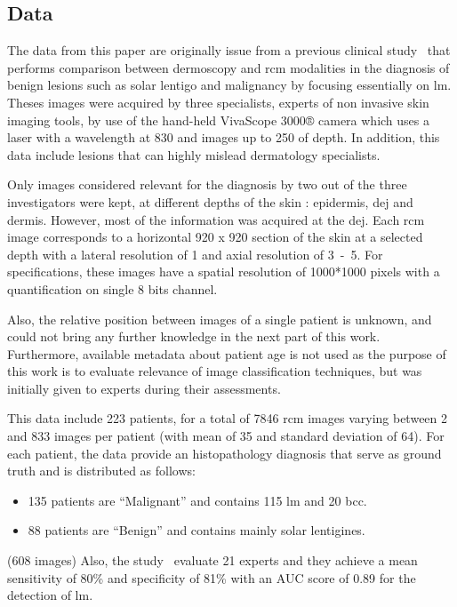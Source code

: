 \documentclass[journal,article,submit,moreauthors,pdftex, applsci]{Definitions/mdpi}
\begin{document}
\subsection{Data}
\label{sec:data}
The data from this paper are originally issue from a previous clinical study~\cite{Cinotti2018} that performs comparison between dermoscopy and \ac{rcm} modalities in the diagnosis of benign lesions such as solar lentigo and malignancy by focusing essentially on \ac{lm}. Theses images were acquired by three specialists, experts of non invasive skin imaging tools, by use of the hand-held VivaScope 3000® camera which uses a laser with a wavelength at \unit{830}{\nano\meter} and images up to \unit{250}{\micro\meter} of depth. In addition, this data include lesions that can highly mislead dermatology specialists.\par
Only images considered relevant for the diagnosis by two out of the three investigators were kept, at different depths of the skin : epidermis, \ac{dej} and dermis. However, most of the information was acquired at the \ac{dej}. Each \ac{rcm} image corresponds to a horizontal \unit{920}{\micro\meter} x \unit{920}{\micro\meter} section of the skin at a selected depth with a lateral resolution of \unit{1}{\micro\meter} and axial resolution of \unit{3-5}{\micro\meter}. For specifications, these images have a spatial resolution of 1000*1000 pixels with a quantification on single 8 bits channel.\par
Also, the relative position between images of a single patient is unknown, and could not bring any further knowledge in the next part of this work. Furthermore, available metadata about patient age is not used as the purpose of this work is to evaluate relevance of image classification techniques, but was initially given to experts during their assessments.\par
This data include 223 patients, for a total of 7846 \ac{rcm} images varying between 2 and 833 images per patient (with mean of 35 and standard deviation of 64). For each patient, the data provide an histopathology diagnosis that serve as ground truth and is distributed as follows:
\begin{itemize}  
\item 135 patients are “Malignant” and contains 115 \ac{lm} and 20 \ac{bcc}.
\item 88 patients are “Benign” and contains mainly solar lentigines.
\end{itemize} (608 images) 
Also, the study~\cite{Cinotti2018} evaluate 21 experts and they achieve a mean sensitivity of 80\% and specificity of 81\% with an AUC score of 0.89 for the detection of \ac{lm}.\par
\end{document}
